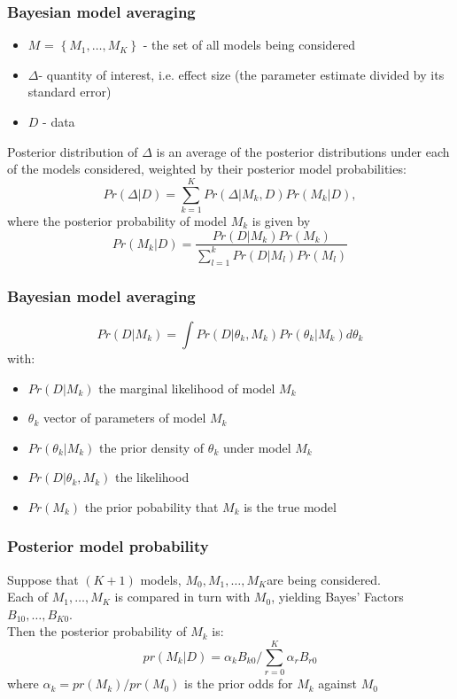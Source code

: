 \documentclass[hyperref={pdfpagelabels=true}]{beamer}
\begin{document}
\begin{frame}
\frametitle{Bayesian model averaging}
\begin{itemize}
\item$M$ = $\left\{M_{1},\ldots,M_{K}\right\}$ - the set of all models being considered
\item $\Delta$- quantity of interest, i.e. effect size (the parameter estimate divided by its standard error)
\item $D$ - data
\end{itemize}
Posterior distribution of $\Delta$ is an average of the posterior distributions under each of the models considered, weighted by their posterior model probabilities:
\[
Pr(\Delta|D) = \sum_{k=1}^{K}Pr(\Delta|M_{k},D)Pr(M_{k}|D),
\]
where the posterior probability of model $M_{k}$ is given by
\[
Pr(M_{k}|D)=\frac{Pr(D|M_{k})Pr(M_{k})}{\sum_{l=1}^{k}Pr(D|M_{l})Pr(M_{l})}
\]
\end{frame}

\begin{frame}
\frametitle{Bayesian model averaging}
\[
Pr(D|M_{k})=\int Pr(D|\theta_{k},M_{k})Pr(\theta_{k}|M_{k})d\theta_{k}
\]
with:
\begin{itemize}
\item $Pr(D|M_{k})$ the marginal likelihood of model $M_{k}$
\item $\theta_{k}$ vector of parameters of model $M_{k}$
\item $Pr(\theta_{k}|M_{k})$ the prior density of $\theta_{k}$ under model $M_{k}$
\item $Pr(D|\theta_{k},M_{k})$ the likelihood
\item $Pr(M_{k})$ the prior pobability that $M_{k}$ is the true model
\end{itemize}
\end{frame}

\begin{frame}
\frametitle{Posterior model probability}
Suppose that $(K +1)$ models, $M_{0},M_{1},\ldots,M_{K}$are being considered.\\
Each of $M_{1},\ldots,M_{K}$ is compared in turn with $M_{0}$, yielding Bayes' Factors $B_{10},\ldots,B_{K0}$.\\
Then the posterior probability of $M_{k}$ is:
\[
pr(M_{k}|D)=\alpha_{k}B_{k0}/\sum_{r=0}^{K}\alpha_{r}B_{r0}
\]
where $\alpha_{k}=pr(M_{k})/pr(M_{0})$ is the prior odds for $M_{k}$ against $M_{0}$
\end{frame}
\end{document}
